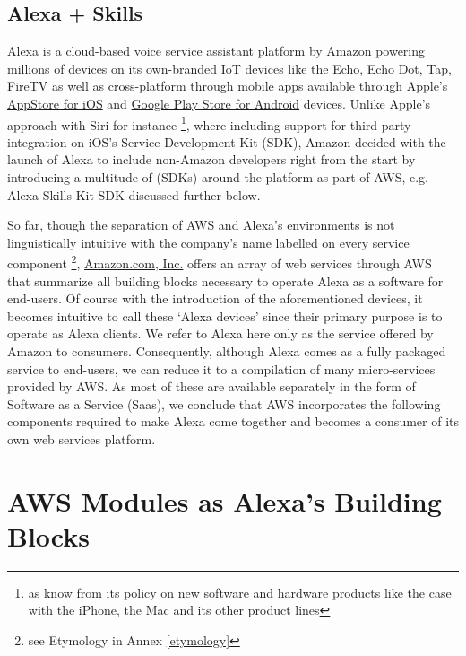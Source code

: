 \subsection*{Alexa + Skills}
\label{alexa:def}
Alexa is a cloud-based voice service assistant platform by Amazon powering millions of devices %
on its own-branded IoT devices like the Echo, Echo Dot, Tap, FireTV as well as cross-platform through mobile apps available through  \href{https://itunes.apple.com/de/app/amazon-alexa/id944011620?l=en&mt=8}{Apple's AppStore for iOS} and  \href{https://play.google.com/store/apps/details?id=com.amazon.dee.app&hl=en}{Google Play Store for Android} devices. Unlike Apple's approach with Siri for instance \footnote{as know from its policy on  new software and hardware products like the case with the iPhone, the Mac and its other product lines}, where including support for third-party integration on iOS's Service Development Kit (SDK), Amazon decided with the launch of Alexa to include non-Amazon developers right from the start by introducing a multitude of (SDKs) around the platform as part of AWS, e.g. Alexa Skills Kit SDK discussed further below.

So far, though the separation of AWS and Alexa's environments is not linguistically intuitive with the company's name labelled on every service component \footnote{see Etymology in Annex \ref{etymology}}, \href{http://www.amazon.com}{Amazon.com, Inc.} offers an array of web services through AWS that summarize all building blocks necessary to operate Alexa as a software for end-users. Of course with the introduction of the aforementioned devices, it becomes intuitive to call these `Alexa devices' since their primary purpose is to operate as Alexa clients. We refer to Alexa here only as the service offered by Amazon to consumers. Consequently, although Alexa comes as a fully packaged service to end-users, we can reduce it to a compilation of many micro-services provided by AWS. As most of these are available separately in the form of Software as a Service (Saas), we conclude that AWS incorporates the following components required to make Alexa come together and becomes a consumer of its own web services platform. 






\section{AWS Modules as Alexa's Building Blocks }
\label{aws:modules}

